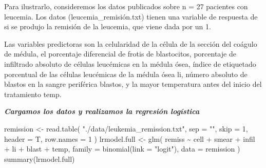 \documentclass[
  letterpaper,
  DIV=11,
  numbers=noendperiod]{scrartcl}
\newenvironment{Shaded}{\begin{snugshade}}{\end{snugshade}}
\newcommand{\AttributeTok}[1]{\textcolor[rgb]{0.40,0.45,0.13}{#1}}
\newcommand{\DecValTok}[1]{\textcolor[rgb]{0.68,0.00,0.00}{#1}}
\newcommand{\FunctionTok}[1]{\textcolor[rgb]{0.28,0.35,0.67}{#1}}
\newcommand{\NormalTok}[1]{\textcolor[rgb]{0.00,0.23,0.31}{#1}}
\newcommand{\OtherTok}[1]{\textcolor[rgb]{0.00,0.23,0.31}{#1}}
\newcommand{\SpecialCharTok}[1]{\textcolor[rgb]{0.37,0.37,0.37}{#1}}
\newcommand{\StringTok}[1]{\textcolor[rgb]{0.13,0.47,0.30}{#1}}
\begin{document}
Para ilustrarlo, consideremos los datos publicados sobre n = 27
pacientes con leucemia. Los datos (leucemia\_remisión.txt) tienen una
variable de respuesta de si se produjo la remisión de la leucemia, que
viene dada por un 1.

Las variables predictoras son la celularidad de la célula de la sección
del coágulo de médula, el porcentaje diferencial de frotis de
blastocitos, porcentaje de infiltrado absoluto de células leucémicas en
la médula ósea, índice de etiquetado porcentual de las células
leucémicas de la médula ósea li, número absoluto de blastos en la sangre
periférica blastos, y la mayor temperatura antes del inicio del
tratamiento temp.

\textbf{\emph{Cargamos los datos y realizamos la regresión logística}}

\begin{Shaded}
\begin{Highlighting}[]
\NormalTok{remission }\OtherTok{\textless{}{-}}
  \FunctionTok{read.table}\NormalTok{(}
    \StringTok{"./data/leukemia\_remission.txt"}\NormalTok{,}
    \AttributeTok{sep =} \StringTok{""}\NormalTok{,}
    \AttributeTok{skip =} \DecValTok{1}\NormalTok{,}
    \AttributeTok{header =}\NormalTok{ T,}
    \AttributeTok{row.names =} \DecValTok{1}
\NormalTok{  )}
\NormalTok{lrmodel.full }\OtherTok{\textless{}{-}}
  \FunctionTok{glm}\NormalTok{(}
\NormalTok{    remiss }\SpecialCharTok{\textasciitilde{}}\NormalTok{ cell }\SpecialCharTok{+}\NormalTok{ smear }\SpecialCharTok{+}\NormalTok{ infil }\SpecialCharTok{+}\NormalTok{ li }\SpecialCharTok{+}\NormalTok{ blast }\SpecialCharTok{+}\NormalTok{ temp,}
    \AttributeTok{family =} \FunctionTok{binomial}\NormalTok{(}\AttributeTok{link =} \StringTok{"logit"}\NormalTok{),}
    \AttributeTok{data =}\NormalTok{ remission}
\NormalTok{  )}
\FunctionTok{summary}\NormalTok{(lrmodel.full)}
\end{Highlighting}
\end{Shaded}
\end{document}
